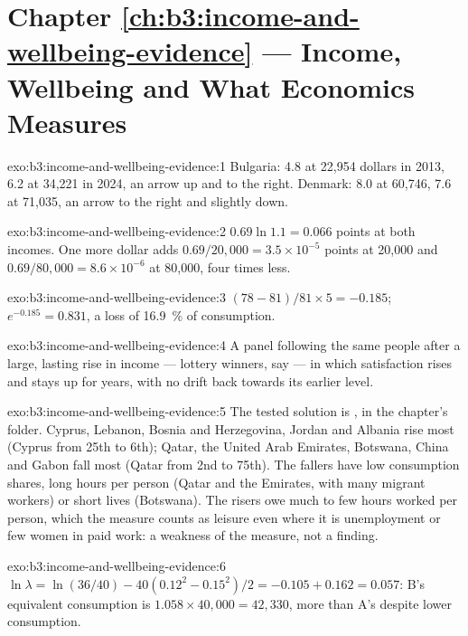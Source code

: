 \section*{Chapter \ref{ch:b3:income-and-wellbeing-evidence} --- Income, Wellbeing and What Economics Measures}

\begin{solution}{exo:b3:income-and-wellbeing-evidence:1}
Bulgaria: 4.8 at 22{,}954 dollars in 2013, 6.2 at 34{,}221 in 2024, an arrow up and to the right. Denmark: 8.0 at 60{,}746, 7.6
at 71{,}035, an arrow to the right and slightly down. %
\end{solution}

\begin{solution}{exo:b3:income-and-wellbeing-evidence:2}
$0.69\ln 1.1 = 0.066$ points at both incomes. One more dollar adds $0.69/20{,}000 = 3.5 \times 10^{-5}$ points at 20{,}000 and $0.69/80{,}000 = 8.6 \times 10^{-6}$ at 80{,}000, four
times less.
\end{solution}

\begin{solution}{exo:b3:income-and-wellbeing-evidence:3}
$(78 - 81)/81 \times 5 = -0.185$; $e^{-0.185} = 0.831$, a loss of 16.9~\% of consumption.
\end{solution}

\begin{solution}{exo:b3:income-and-wellbeing-evidence:4}
A panel following the same people after a large, lasting rise in income --- lottery
winners, say --- in which satisfaction rises and stays up for years, with no drift
back towards its earlier level.
\end{solution}

\begin{solution}{exo:b3:income-and-wellbeing-evidence:5}
The tested solution is , in the chapter's 
folder. Cyprus, Lebanon, Bosnia and Herzegovina, Jordan and Albania rise most (Cyprus from 25th to 6th); Qatar,
the United Arab Emirates, Botswana, China and Gabon fall most (Qatar from 2nd to 75th). The fallers have low consumption
shares, long hours per person (Qatar and the Emirates, with many migrant workers) or short lives (Botswana).
The risers owe much to few hours worked per person, which the measure counts as leisure even where it is
unemployment or few women in paid work: a weakness of the measure, not a finding. %
\end{solution}

\begin{solution}{exo:b3:income-and-wellbeing-evidence:6}
$\ln\lambda = \ln(36/40) - 40(0.12^2 - 0.15^2)/2 = -0.105 + 0.162 = 0.057$: B's equivalent consumption is $1.058 \times 40{,}000 = 42{,}330$, more than A's despite lower
consumption.
\end{solution}

